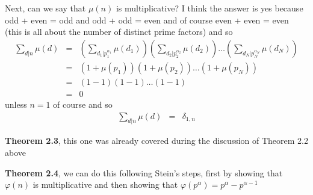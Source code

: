 \documentclass[aps,preprint,preprintnumbers,nofootinbib,showpacs,prd]{revtex4-1}
\newcommand{\nbea}{\begin{eqnarray*}}
\newcommand{\neea}{\end{eqnarray*}}
\begin{document}
Next, can we say that $\mu(n)$ is multiplicative? I think the answer is yes because odd + even = odd and odd + odd = even and of course even + even = even (this is all about the number of distinct prime factors) and so
%
\nbea
\sum_{d|n}\mu(d) & = & \left(\sum_{d_1|p_1^{\alpha_1}}\mu(d_1)\right)\left(\sum_{d_2|p_2^{\alpha_2}}\mu(d_2)\right) \ldots \left(\sum_{d_N|p_N^{\alpha_N}}\mu(d_N)\right) \\
& = & \left(1+\mu(p_1)\right)\left(1+\mu(p_2)\right) \ldots \left(1+\mu(p_N)\right) \\
& = & (1-1)(1-1) \ldots (1-1) \\
& = & 0
\neea
%
unless $n=1$ of course and so
%
\nbea
\sum_{d|n}\mu(d) & = & \delta_{1,n}
\neea
%

{\bf Theorem 2.3}, this one was already covered during the discussion of Theorem 2.2 above

{\bf Theorem 2.4}, we can do this following Stein's steps, first by showing that $\varphi(n)$ is multiplicative and then showing that $\varphi(p^\alpha) = p^\alpha - p^{\alpha-1}$
\end{document}

